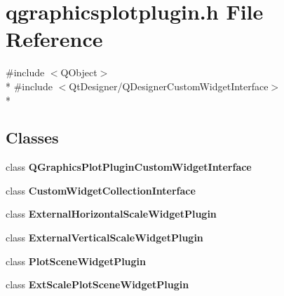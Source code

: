 \section{qgraphicsplotplugin.\+h File Reference}
\label{bk3_2plugins_2qgraphicsplotplugin_8h}
{\ttfamily \#include $<$Q\+Object$>$}\\*
{\ttfamily \#include $<$Qt\+Designer/\+Q\+Designer\+Custom\+Widget\+Interface$>$}\\*
\subsection*{Classes}
\begin{DoxyCompactItemize}
\item 
class {\bf Q\+Graphics\+Plot\+Plugin\+Custom\+Widget\+Interface}
\item 
class {\bf Custom\+Widget\+Collection\+Interface}
\item 
class {\bf External\+Horizontal\+Scale\+Widget\+Plugin}
\item 
class {\bf External\+Vertical\+Scale\+Widget\+Plugin}
\item 
class {\bf Plot\+Scene\+Widget\+Plugin}
\item 
class {\bf Ext\+Scale\+Plot\+Scene\+Widget\+Plugin}
\end{DoxyCompactItemize}
